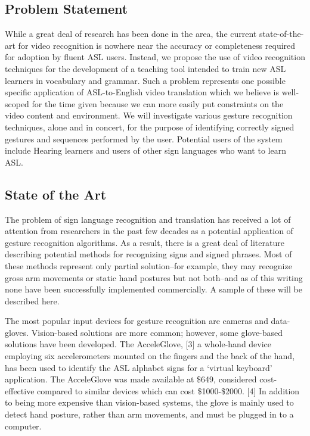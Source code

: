 \documentclass[12pt]{article}
\begin{document}
\subsection{Problem Statement}
While a great deal of research has been done in the area, the current state-of-the-art for video recognition is nowhere near the accuracy or completeness required for adoption by fluent ASL users. Instead, we propose the use of video recognition techniques for the development of a teaching tool intended to train new ASL learners in vocabulary and grammar. Such a problem represents one possible specific application of ASL-to-English video translation which we believe is well-scoped for the time given because we can more easily put constraints on the video content and environment. We will investigate various gesture recognition techniques, alone and in concert, for the purpose of identifying correctly signed gestures and sequences performed by the user. Potential users of the system include Hearing learners and users of other sign languages who want to learn ASL.

\subsection{State of the Art}

The problem of sign language recognition and translation has received a lot of attention from researchers in the past few decades as a potential application of gesture recognition algorithms. As a result, there is a great deal of literature describing potential methods for recognizing signs and signed phrases. Most of these methods represent only partial solution--for example, they may recognize gross arm movements or static hand postures but not both--and as of this writing none have been successfully implemented commercially. A sample of these will be described here.

The most popular input devices for gesture recognition are cameras and data-gloves. Vision-based solutions are more common; however, some glove-based solutions have been developed. The AcceleGlove, [3] a whole-hand device employing six accelerometers mounted on the fingers and the back of the hand, has been used to identify the ASL alphabet signs for a ‘virtual keyboard’ application. The AcceleGlove was made available at \$649, considered cost-effective compared to similar devices which can cost \$1000-\$2000. [4] In addition to being more expensive than vision-based systems, the glove is mainly used to detect hand posture, rather than arm movements, and must be plugged in to a computer.
\end{document}
